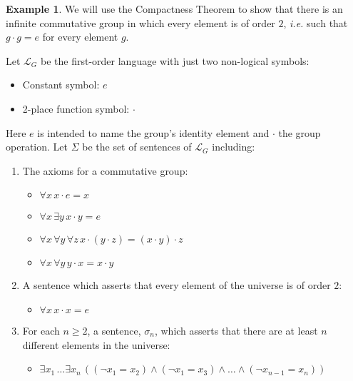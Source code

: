 \documentclass[12pt]{amsbook}
\theoremstyle{plain}
\theoremstyle{definition}
\newtheorem{exmp}{Example}[chapter]
\theoremstyle{remark}
\begin{document}
\begin{exmp} \label{e:com}
We will use the Compactness Theorem to show that there is an infinite commutative group in which every element is of order $2$,  {\em i.e.\/} such that $g \cdot g = e$ for every element $g$. 

Let $\mathcal{L}_G$ be the first-order language with just two non-logical symbols:
\begin{itemize}  
\item Constant symbol:  $e$
\item 2-place function symbol:  $\cdot$
\end{itemize}
Here $e$ is intended to name the group's identity element and $\cdot$ the group operation.  Let $\Sigma$ be the set of sentences of $\mathcal{L}_G$ including:
\begin{enumerate}
\item The axioms for a commutative group:
\begin{itemize}
\item $\forall x\, x\cdot e = x$
\item $\forall x\, \exists y\, x \cdot y = e$
\item $\forall x\, \forall y\, \forall z\, x \cdot (y \cdot z) = (x \cdot y) \cdot z$
\item $\forall x\, \forall y\, y \cdot x = x \cdot y$
\end{itemize}
\item A sentence which asserts that every element of the universe is of order $2$:
\begin{itemize}
\item $\forall x\, x \cdot x = e$
\end{itemize}
\item For each $n \ge 2$,  a sentence,  $\sigma_n$,  which asserts that there are at least $n$ different elements in the universe:
\begin{itemize}
\item $\exists x_1\, \dots \exists x_n\, ( (\lnot x_1 = x_2) \land (\lnot x_1 = x_3) \land \dots \land (\lnot x_{n-1} = x_n))$
\end{itemize} 
\end{enumerate}


\end{exmp}
\end{document}
